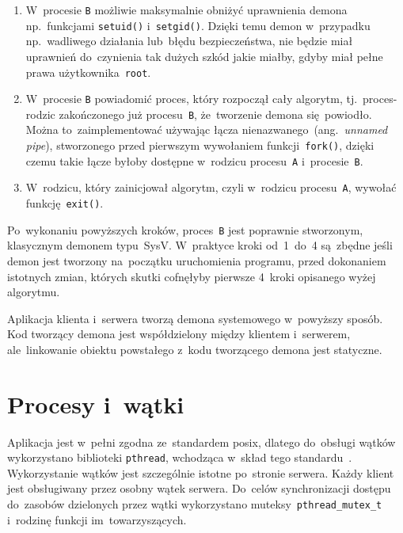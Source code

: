 \documentclass[thesis]{subfiles}
\begin{document}
\begin{enumerate}
	\item W~procesie \texttt{B} możliwie maksymalnie obniżyć uprawnienia demona np.~funkcjami \texttt{setuid()} i~\texttt{setgid()}. Dzięki temu demon w~przypadku np.~wadliwego działania lub~błędu bezpieczeństwa, nie będzie miał uprawnień do~czynienia tak dużych szkód jakie miałby, gdyby miał pełne prawa użytkownika~\texttt{root}.
	\item W~procesie \texttt{B} powiadomić proces, który rozpoczął cały algorytm, tj.~proces-rodzic zakończonego już procesu~\texttt{B}, że~tworzenie demona się~powiodło. Można to~zaimplementować używając łącza nienazwanego~(ang.~\emph{unnamed pipe}), stworzonego przed pierwszym wywołaniem funkcji~\texttt{fork()}, dzięki czemu takie łącze byłoby dostępne w~rodzicu procesu~\texttt{A} i~procesie~\texttt{B}.
	\item W~rodzicu, który zainicjował algorytm, czyli w~rodzicu procesu~\texttt{A}, wywołać funkcję~\texttt{exit()}.
\end{enumerate}
Po~wykonaniu powyższych kroków, proces~\texttt{B} jest poprawnie stworzonym, klasycznym demonem typu~SysV. W~praktyce kroki od~1~do~4 są~zbędne jeśli demon jest tworzony na~początku uruchomienia programu, przed dokonaniem istotnych zmian, których skutki cofnęłyby pierwsze 4~kroki opisanego wyżej algorytmu.

Aplikacja klienta i~serwera tworzą demona systemowego w~powyższy sposób. Kod tworzący demona jest współdzielony między klientem i~serwerem, ale~linkowanie obiektu powstałego z~kodu tworzącego demona jest statyczne.


\section{Procesy i~wątki}

Aplikacja jest w~pełni zgodna ze~standardem \gls{posix}, dlatego do~obsługi wątków wykorzystano biblioteki \texttt{pthread}, wchodząca w~skład tego standardu~\cite{pthreads-posix-manual}. Wykorzystanie wątków jest szczególnie istotne po~stronie serwera. Każdy klient jest obsługiwany przez osobny wątek serwera. Do~celów synchronizacji dostępu do~zasobów dzielonych przez wątki wykorzystano muteksy~\texttt{pthread\_mutex\_t} i~rodzinę funkcji im~towarzyszących.

\end{document}
